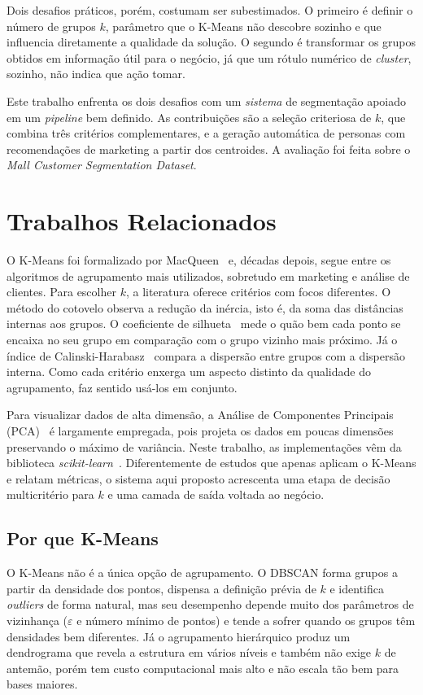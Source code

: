 \documentclass[conference]{IEEEtran}
\begin{document}
Dois desafios pr\'aticos, por\'em, costumam ser subestimados. O primeiro \'e definir o n\'umero de grupos $k$, par\^ametro que o K-Means n\~ao descobre sozinho e que influencia diretamente a qualidade da solu\c{c}\~ao. O segundo \'e transformar os grupos obtidos em informa\c{c}\~ao \'util para o neg\'ocio, j\'a que um r\'otulo num\'erico de \textit{cluster}, sozinho, n\~ao indica que a\c{c}\~ao tomar.

Este trabalho enfrenta os dois desafios com um \textit{sistema} de segmenta\c{c}\~ao apoiado em um \textit{pipeline} bem definido. As contribui\c{c}\~oes s\~ao a sele\c{c}\~ao criteriosa de $k$, que combina tr\^es crit\'erios complementares, e a gera\c{c}\~ao autom\'atica de personas com recomenda\c{c}\~oes de marketing a partir dos centroides. A avalia\c{c}\~ao foi feita sobre o \textit{Mall Customer Segmentation Dataset}.

\section{Trabalhos Relacionados}
O K-Means foi formalizado por MacQueen~\cite{macqueen1967} e, d\'ecadas depois, segue entre os algoritmos de agrupamento mais utilizados, sobretudo em marketing e an\'alise de clientes. Para escolher $k$, a literatura oferece crit\'erios com focos diferentes. O m\'etodo do cotovelo observa a redu\c{c}\~ao da in\'ercia, isto \'e, da soma das dist\^ancias internas aos grupos. O coeficiente de silhueta~\cite{rousseeuw1987} mede o qu\~ao bem cada ponto se encaixa no seu grupo em compara\c{c}\~ao com o grupo vizinho mais pr\'oximo. J\'a o \'indice de Calinski-Harabasz~\cite{calinski1974} compara a dispers\~ao entre grupos com a dispers\~ao interna. Como cada crit\'erio enxerga um aspecto distinto da qualidade do agrupamento, faz sentido us\'a-los em conjunto.

Para visualizar dados de alta dimens\~ao, a An\'alise de Componentes Principais (PCA)~\cite{jolliffe2002} \'e largamente empregada, pois projeta os dados em poucas dimens\~oes preservando o m\'aximo de vari\^ancia. Neste trabalho, as implementa\c{c}\~oes v\^em da biblioteca \textit{scikit-learn}~\cite{pedregosa2011}. Diferentemente de estudos que apenas aplicam o K-Means e relatam m\'etricas, o sistema aqui proposto acrescenta uma etapa de decis\~ao multicrit\'erio para $k$ e uma camada de sa\'ida voltada ao neg\'ocio.

\subsection{Por que K-Means}
O K-Means n\~ao \'e a \'unica op\c{c}\~ao de agrupamento. O DBSCAN forma grupos a partir da densidade dos pontos, dispensa a defini\c{c}\~ao pr\'evia de $k$ e identifica \textit{outliers} de forma natural, mas seu desempenho depende muito dos par\^ametros de vizinhan\c{c}a ($\varepsilon$ e n\'umero m\'inimo de pontos) e tende a sofrer quando os grupos t\^em densidades bem diferentes. J\'a o agrupamento hier\'arquico produz um dendrograma que revela a estrutura em v\'arios n\'iveis e tamb\'em n\~ao exige $k$ de antem\~ao, por\'em tem custo computacional mais alto e n\~ao escala t\~ao bem para bases maiores.
\end{document}
